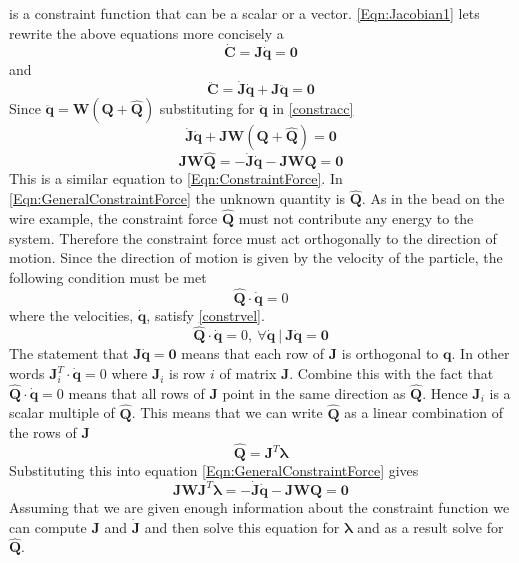 is a constraint function that can be a scalar or a vector.
\ref{Eqn:Jacobian1} lets rewrite the above equations more concisely a
\begin{equation}
    \label{constrvel}
    \mathbf{\dot{C}} =
    \mathbf{J}\mathbf{\dot{q}} =
    \mathbf{0}
\end{equation}
and
\begin{equation}
    \label{constracc}
    \mathbf{\ddot{C}} =
    \mathbf{\dot{J}}\mathbf{\dot{q}} + \mathbf{J}\mathbf{\ddot{q}} =
    \mathbf{0}
\end{equation}
Since $\mathbf{\ddot{q}} = \mathbf{W}\left(\mathbf{Q} + \mathbf{\hat{Q}}\right)$
substituting for $\mathbf{\ddot{q}}$ in \ref{constracc}
\begin{equation}
    \mathbf{\dot{J}}\mathbf{\dot{q}} + 
    \mathbf{J}\mathbf{W}\left(\mathbf{Q} + 
    \mathbf{\hat{Q}}\right) =
    \mathbf{0}
\end{equation} 
\begin{equation}
    \label{Eqn:GeneralConstraintForce}
    \mathbf{JW\hat{Q}} = 
    -\mathbf{\dot{J}\dot{q}} -  
    \mathbf{JWQ} =
    \mathbf{0}
\end{equation}
This is a similar equation to \ref{Eqn:ConstraintForce}. In
\ref{Eqn:GeneralConstraintForce} the unknown quantity is $\mathbf{\hat{Q}}$. 
As in the bead on the wire example, the constraint force $\mathbf{\hat{Q}}$ must
not contribute any energy to the system. Therefore the constraint force must act
orthogonally to the direction of motion. Since the direction of motion is given
by the velocity of the particle, the following condition must be met
\[
    \mathbf{\hat{Q}\cdot\dot{q}} = 0 
\]
where the velocities, $\mathbf{\dot{q}}$, satisfy \ref{constrvel}. 
\[
    \mathbf{\hat{Q}\cdot\dot{q}} = 0, \ \forall 
    \mathbf{\dot{q}} \ \vert \ \mathbf{J\dot{q}} = \mathbf{0}  
\]
The statement that $\mathbf{J\dot{q}} = \mathbf{0}$ means that each row of
$\mathbf{J}$ is orthogonal to $\mathbf{q}$. In other words $\mathbf{J}_i^T \cdot
\mathbf{\dot{q}} = 0$ where $\mathbf{J}_i$ is row $i$ of matrix $\mathbf{J}$.
Combine this with the fact that $\mathbf{\hat{Q}\cdot\dot{q}} = 0$ means that
all rows of $\mathbf{J}$ point in the same direction as $\mathbf{\hat{Q}}$.
Hence $\mathbf{J}_i$ is a scalar multiple of $\mathbf{\hat{Q}}$. This means that
we can write $\mathbf{\hat{Q}}$ as a linear combination of the rows of
$\mathbf{J}$
\begin{equation}
	\label{Eqn:ConForce}
    \mathbf{\hat{Q}} = \mathbf{J}^T\mathbf{\lambda}
\end{equation}
Substituting this into equation \ref{Eqn:GeneralConstraintForce} gives
\begin{equation}
    \label{Eqn:LambdaGeneral}
    \mathbf{JWJ}^T \mathbf{\lambda} = 
    -\mathbf{\dot{J}\dot{q}} -  
    \mathbf{JWQ} =
    \mathbf{0}
\end{equation}
Assuming that we are given enough information about the constraint function we
can compute $\mathbf{J}$ and $\mathbf{\dot{J}}$ and then solve this equation for
$\mathbf{\lambda}$ and as a result solve for $\mathbf{\hat{Q}}$.


